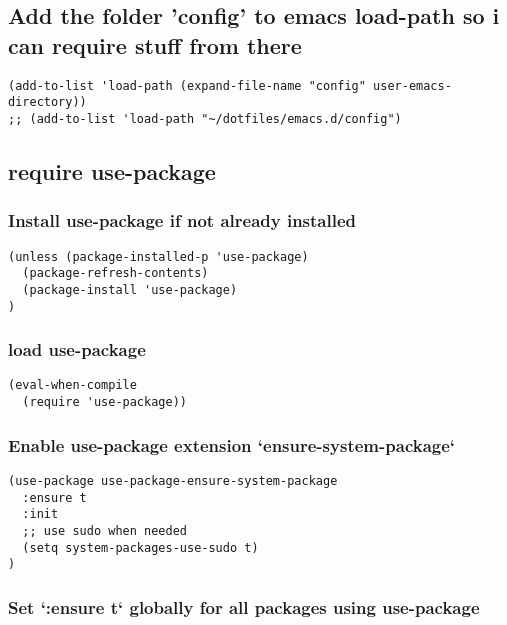 \documentclass[11pt]{article}
\begin{document}
\subsection*{Add the folder 'config' to emacs load-path so i can require stuff from there}
\label{sec:org7fabfc4}

\begin{verbatim}
(add-to-list 'load-path (expand-file-name "config" user-emacs-directory))
;; (add-to-list 'load-path "~/dotfiles/emacs.d/config")
\end{verbatim}

\subsection*{require use-package}
\label{sec:org0c06f6a}

\subsubsection*{Install use-package if not already installed}
\label{sec:org3b0a608}
\begin{verbatim}
(unless (package-installed-p 'use-package)
  (package-refresh-contents)
  (package-install 'use-package)
)
\end{verbatim}

\subsubsection*{load use-package}
\label{sec:org86e2279}
\begin{verbatim}
(eval-when-compile
  (require 'use-package))
\end{verbatim}

\subsubsection*{Enable use-package extension `ensure-system-package`}
\label{sec:org0b7bdc7}
\begin{verbatim}
(use-package use-package-ensure-system-package
  :ensure t
  :init
  ;; use sudo when needed
  (setq system-packages-use-sudo t)
)
\end{verbatim}

\subsubsection*{Set `:ensure t` globally for all packages using use-package}
\label{sec:orgfc8eb58}
\end{document}
